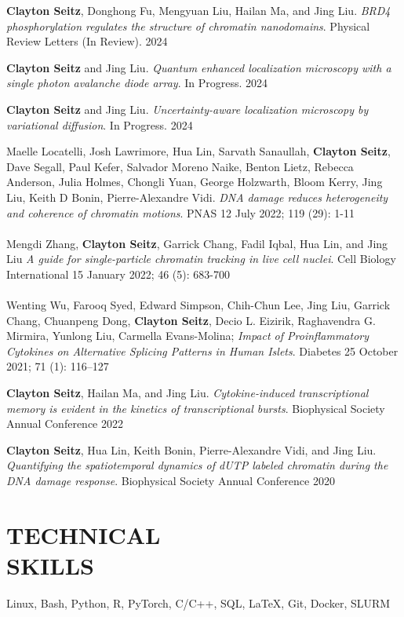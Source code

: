 \documentclass[margin, 10pt]{res} %
\begin{document}
\begin{resume}
\textbf{Clayton Seitz}\textsuperscript{\textdagger}, Donghong Fu\textsuperscript{\textdagger}, Mengyuan Liu, Hailan Ma, and Jing Liu. \textit{BRD4 phosphorylation regulates the structure of chromatin nanodomains}. Physical Review Letters (In Review). 2024

\textbf{Clayton Seitz} and Jing Liu. \textit{Quantum enhanced localization microscopy with a single photon avalanche diode array}. In Progress. 2024

\textbf{Clayton Seitz} and Jing Liu. \textit{Uncertainty-aware localization microscopy by variational diffusion}. In Progress. 2024

Maelle Locatelli\textsuperscript{\textdagger}, Josh Lawrimore\textsuperscript{\textdagger}, Hua Lin\textsuperscript{\textdagger}, Sarvath Sanaullah, \textbf{Clayton Seitz}, Dave Segall, Paul Kefer, Salvador Moreno Naike, Benton Lietz, Rebecca Anderson, Julia Holmes, Chongli Yuan, George Holzwarth, Bloom Kerry, Jing Liu, Keith D Bonin, Pierre-Alexandre Vidi. \textit{DNA damage reduces heterogeneity and coherence of chromatin motions}. PNAS 12 July 2022; 119 (29): 1-11
\\
\\
Mengdi Zhang, \textbf{Clayton Seitz}, Garrick Chang, Fadil Iqbal, Hua Lin, and Jing Liu \textit{A guide for single-particle chromatin tracking in live cell nuclei}. Cell Biology International 15 January 2022; 46 (5): 683-700
\\
\\
Wenting Wu, Farooq Syed, Edward Simpson, Chih-Chun Lee, Jing Liu, Garrick Chang, Chuanpeng Dong, \textbf{Clayton Seitz}, Decio L. Eizirik, Raghavendra G. Mirmira, Yunlong Liu, Carmella Evans-Molina; \textit{Impact of Proinflammatory Cytokines on Alternative Splicing Patterns in Human Islets}. Diabetes 25 October 2021; 71 (1): 116–127

\textbf{Clayton Seitz}, Hailan Ma, and Jing Liu. \textit{Cytokine-induced transcriptional memory is evident in the kinetics of transcriptional bursts}. Biophysical Society Annual Conference 2022


\textbf{Clayton Seitz}, Hua Lin, Keith Bonin, Pierre-Alexandre Vidi, and Jing Liu. \textit{Quantifying the spatiotemporal dynamics of dUTP labeled chromatin during the DNA damage response}. Biophysical Society Annual Conference 2020


\section{TECHNICAL \\ SKILLS} 

Linux, Bash, Python, R, PyTorch, C/C++, SQL, LaTeX, Git, Docker, SLURM\\

\end{resume}
\end{document}
